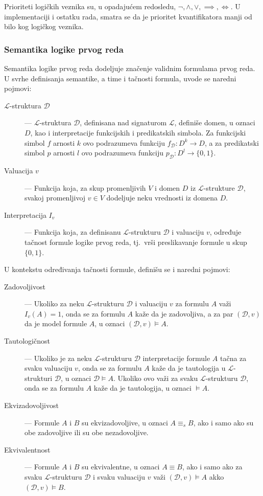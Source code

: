 \documentclass[a4paper,10pt]{article}
\begin{document}
Prioriteti logičkih veznika su, u opadajućem redosledu, $\lnot, \land, \lor, \implies, \iff$. U implementaciji i ostatku rada, smatra se da je prioritet kvantifikatora manji od bilo kog logičkog veznika.

\subsubsection{Semantika logike prvog reda}

Semantika logike prvog reda dodeljuje značenje validnim formulama prvog reda. U svrhe definisanja semantike, a time i tačnosti formula, uvode se naredni pojmovi:

\begin{description}
    \item[$\mathcal{L}$-struktura $\mathcal{D}$] --- $\mathcal{L}$-struktura $\mathcal{D}$, definisana nad signaturom $\mathcal{L}$, definiše domen, u oznaci $D$, kao i interpretacije funkcijskih i predikatskih simbola. Za funkcijski simbol $f$ arnosti $k$ ovo podrazumeva funkciju $f_\mathcal{D}:D^k \rightarrow D$, a za predikatski simbol $p$ arnosti $l$ ovo podrazumeva funkciju $p_\mathcal{D}: D^l \rightarrow \{0, 1\}$.
    \item[Valuacija $v$] --- Funkcija koja, za skup promenljivih $V$ i domen $D$ iz $\mathcal{L}$-strukture $\mathcal{D}$, svakoj promenljivoj $v \in V$ dodeljuje neku vrednosti iz domena $D$.
    \item[Interpretacija $I_v$] --- Funkcija koja, za definisanu $\mathcal{L}$-strukturu $\mathcal{D}$ i valuaciju $v$, određuje tačnost formule logike prvog reda, tj.~vrši preslikavanje formule u skup $\{0, 1\}$.
\end{description}

U kontekstu određivanja tačnosti formule, definišu se i naredni pojmovi:
\begin{description}
    \item[Zadovoljivost] --- Ukoliko za neku $\mathcal{L}$-strukturu $\mathcal{D}$ i valuaciju $v$ za formulu $A$ važi $I_v(A) = 1$, onda se za formulu $A$ kaže da je zadovoljiva, a za par $(\mathcal{D}, v)$ da je model formule $A$, u oznaci $(\mathcal{D}, v) \vDash A$.
    \item[Tautologičnost] --- Ukoliko je za neku $\mathcal{L}$-strukturu $\mathcal{D}$ interpretacije formule $A$ tačna za svaku valuaciju $v$, onda se za formulu $A$ kaže da je tautologija u $\mathcal{L}$-strukturi $\mathcal{D}$, u oznaci $\mathcal{D} \vDash A$. Ukoliko ovo važi za svaku $\mathcal{L}$-strukturu $\mathcal{D}$, onda se za formulu $A$ kaže da je tautologija, u oznaci $\vDash A$.
    \item[Ekvizadovoljivost] --- Formule $A$ i $B$ su ekvizadovoljive, u oznaci $A \equiv_s B$, ako i samo ako su obe zadovoljive ili su obe nezadovoljive.
    \item[Ekvivalentnost] --- Formule $A$ i $B$ su ekvivalentne, u oznaci $A \equiv B$, ako i samo ako za svaku $\mathcal{L}$-strukturu $\mathcal{D}$ i svaku valuaciju $v$ važi $(\mathcal{D}, v) \vDash A$ akko $(\mathcal{D}, v) \vDash B$.
\end{description}
\end{document}
